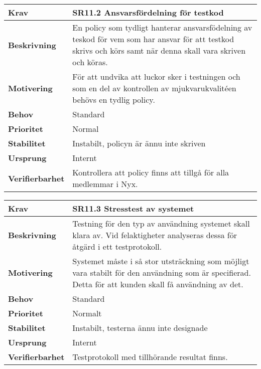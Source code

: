 \documentclass[a4paper, twoside, 11pt, titlepage]{article}
\begin{document}
\begin{tabular} { p{2.6cm} p{12.5cm} }
	\hline
	\sffamily\textbf{Krav} & \sffamily\textbf{SR11.2 Ansvarsfördelning för testkod } \\
	\hline
	\sffamily\textbf{Beskrivning} &  En policy som tydligt hanterar ansvarsfödelning av teskod för vem som har ansvar för att testkod skrivs och körs samt när denna skall vara skriven och köras.  \\
	\hline
	\sffamily\textbf{Motivering} &  För att undvika att luckor sker i testningen och som en del av kontrollen av mjukvarukvalitéen behövs en tydlig policy.   \\
	\hline
	\sffamily\textbf{Behov} &  Standard  \\
	\hline
	\sffamily\textbf{Prioritet} &  Normal  \\
	\hline
	\sffamily\textbf{Stabilitet} &  Instabilt, policyn är ännu inte skriven  \\
	\hline
	\sffamily\textbf{Ursprung} &  Internt   \\
	\hline
	\sffamily\textbf{Verifierbarhet} &  Kontrollera att policy finns att tillgå för alla medlemmar i Nyx.  \\
	\hline
\end{tabular}
\vspace{6mm}

\begin{tabular} { p{2.6cm} p{12.5cm} }
	\hline
	\sffamily\textbf{Krav} & \sffamily\textbf{SR11.3 Stresstest av systemet } \\
	\hline
	\sffamily\textbf{Beskrivning} & Testning för den typ av användning systemet skall klara av. Vid felaktigheter analyseras dessa för åtgärd i ett testprotokoll.   \\
	\hline
	\sffamily\textbf{Motivering} &  Systemet måste i så stor utsträckning som möjligt vara stabilt för den användning som är specifierad. Detta för att kunden skall få användning av det.   \\
	\hline
	\sffamily\textbf{Behov} & Standard  \\
	\hline
	\sffamily\textbf{Prioritet} &  Normalt  \\
	\hline
	\sffamily\textbf{Stabilitet} &  Instabilt, testerna ännu inte designade  \\
	\hline
	\sffamily\textbf{Ursprung} &  Internt   \\
	\hline
	\sffamily\textbf{Verifierbarhet} &  Testprotokoll med tillhörande resultat finns.   \\
	\hline
\end{tabular}
\vspace{6mm}
\end{document}
